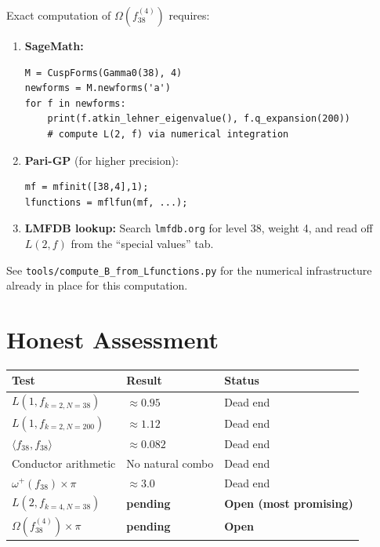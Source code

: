 \documentclass[12pt,a4paper]{article}
\theoremstyle{definition}
\theoremstyle{remark}
\begin{document}
Exact computation of $\Omega(f_{38}^{(4)})$ requires:

\begin{enumerate}
  \item \textbf{SageMath:}
\begin{verbatim}
M = CuspForms(Gamma0(38), 4)
newforms = M.newforms('a')
for f in newforms:
    print(f.atkin_lehner_eigenvalue(), f.q_expansion(200))
    # compute L(2, f) via numerical integration
\end{verbatim}

  \item \textbf{Pari-GP} (for higher precision):
\begin{verbatim}
mf = mfinit([38,4],1);
lfunctions = mflfun(mf, ...);
\end{verbatim}

  \item \textbf{LMFDB lookup:} Search \texttt{lmfdb.org} for level 38,
        weight 4, and read off $L(2,f)$ from the ``special values'' tab.
\end{enumerate}

See \texttt{tools/compute\_B\_from\_Lfunctions.py} for the numerical
infrastructure already in place for this computation.

\section{Honest Assessment}
\label{sec:assessment}

\begin{center}
\begin{tabular}{lll}
  \toprule
  Test & Result & Status \\
  \midrule
  $L(1, f_{k=2,N=38})$ & $\approx 0.95$ & Dead end \\
  $L(1, f_{k=2,N=200})$ & $\approx 1.12$ & Dead end \\
  $\langle f_{38}, f_{38} \rangle$ & $\approx 0.082$ & Dead end \\
  Conductor arithmetic & No natural combo & Dead end \\
  $\omega^+(f_{38}) \times \pi$ & $\approx 3.0$ & Dead end \\
  $L(2, f_{k=4,N=38})$ & \textbf{pending} & \textbf{Open (most promising)} \\
  $\Omega(f_{38}^{(4)}) \times \pi$ & \textbf{pending} & \textbf{Open} \\
  \bottomrule
\end{tabular}
\end{center}
\end{document}
